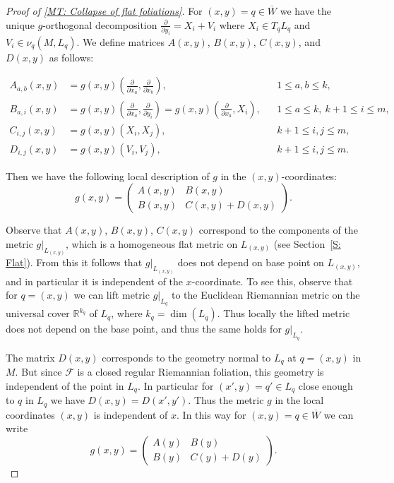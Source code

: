 \documentclass[12pt,a4paper,reqno]{amsart}
\theoremstyle{definition}
\numberwithin{equation}{section}
\newcommand{\fol}{\mathcal{F}}
\newcommand{\R}{\mathbb{R}} %
\begin{document}
\begin{proof}[Proof of \th\ref{MT: Collapse of flat foliations}]
For $(x,y) = q\in \overline{W}$ we have the unique $g$-orthogonal decomposition $\frac{\partial}{\partial y_i} = X_i+V_i$ where $X_i\in T_{q} L_{q}$ and $V_i\in \nu_{q}(M,L_{q})$. We define matrices $A(x,y)$, $B(x,y)$, $C(x,y)$, and $D(x,y)$ as follows:
\begin{linenomath}
\begin{align*}
A_{a,b}(x,y)&=g(x,y)\left(\frac{\partial}{\partial x_a},\frac{\partial}{\partial x_b}\right),  & &1\leq a,b\leq k,\\
B_{a,i}(x,y) &=g(x,y)\left(\frac{\partial}{\partial x_a},\frac{\partial}{\partial y_i}\right) = g(x,y)\left(\frac{\partial}{\partial x_a},X_i\right), & &1\leq a\leq k,\: k+1\leq i\leq m,\\
C_{i,j}(x,y)&= g(x,y)(X_i,X_j), & &k+1\leq i,j\leq m,\\
D_{i,j}(x,y)&= g(x,y)(V_i,V_j), & &k+1\leq i,j\leq m.
\end{align*}
\end{linenomath}
Then we have the following local description of $g$ in the $(x,y)$-coordinates:
\[
g(x,y) 
= \begin{pmatrix}
  A(x,y) & B(x,y) \\
  B(x,y) & C(x,y)+D(x,y)
\end{pmatrix}.
\]

Observe that $A(x,y)$, $B(x,y)$, $C(x,y)$  correspond to the components  of the metric $g|_{L_{(x,y)}}$, which is a  homogeneous flat metric on $L_{(x,y)}$ (see Section~\ref{S: Flat}). From this it follows that $g|_{L_{(x,y)}}$ does not depend on base point on $L_{(x,y)}$, and in particular it is independent of the $x$-coordinate. To see this, observe that for $q= (x,y)$ we can lift metric $g|_{L_q}$ to the Euclidean Riemannian metric on the universal cover $\R^{k_q}$ of $L_q$, where $k_q = \dim(L_q)$. Thus locally the lifted metric does not depend on the base point, and thus the same holds for $g|_{L_q}$.

The matrix $D(x,y)$ corresponds to the geometry  normal to $L_q$ at $q=(x,y)$ in $M$. But since $\fol$ is a closed regular Riemannian foliation, this geometry is independent of the point in $L_q$. In particular for $(x',y) = q'\in L_q$ close enough to $q$ in $L_q$ we have $D(x,y) = D(x',y')$. Thus the metric $g$ in the local coordinates $(x,y)$ is independent of $x$. In this way for $(x,y) = q\in \overline{W}$ we can write
\[
g(x,y) = \begin{pmatrix}
  A(y) & B(y) \\
  B(y) & C(y)+D(y)
\end{pmatrix}.
\]


\end{proof}
\end{document}

